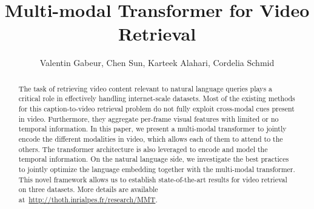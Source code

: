 \documentclass[runningheads]{llncs}
\begin{document}
\newcommand{\new}[1]{\textcolor{red}{#1}}
\newcommand{\valsays}[1]{\textcolor{red}{[Val: #1]}}
\newcommand{\chensays}[1]{\textcolor{blue}{[Chen: #1]}}
\newcommand{\karsays}[1]{\textcolor{blue}{[KA: #1]}}
\newcommand{\corsays}[1]{\textcolor{cyan}{[Cordelia: #1]}}

\newcommand\inner[2]{\langle #1, #2 \rangle}
\DeclarePairedDelimiter\abs{\lvert}{\rvert}\DeclarePairedDelimiter\norm{\lVert}{\rVert}

\pagestyle{headings}
\mainmatter
\def\ECCVSubNumber{1710}  

\title{Multi-modal Transformer for Video Retrieval} 



\author{Valentin Gabeur,
Chen Sun,
Karteek Alahari,
Cordelia Schmid
}
\maketitle

\begin{abstract}
The task of retrieving video content relevant to natural language queries plays a critical role in effectively handling internet-scale datasets. Most of the existing methods for this caption-to-video retrieval problem do not fully exploit cross-modal cues present in video. 
Furthermore, they aggregate per-frame visual features with limited or no temporal information.
In this paper, we present a multi-modal transformer to jointly encode the different modalities in video, which allows each of them to attend to the others. The transformer architecture is also leveraged to encode and model the temporal information. On the natural language side, we investigate the best practices to jointly optimize the language embedding together with the multi-modal transformer. This novel framework allows us to establish state-of-the-art results for video retrieval on three datasets. More details are available at~\url{http://thoth.inrialpes.fr/research/MMT}.

\end{abstract} 
\end{document}
